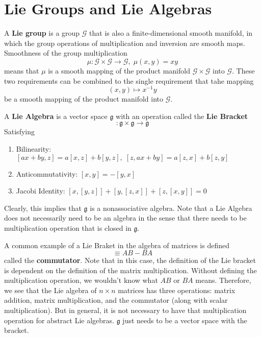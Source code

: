 \section{Lie Groups and Lie Algebras}

  \begin{definition}
    A \textbf{Lie group} is a group $\mathcal{G}$ that is also a finite-dimensional smooth manifold, in which the group operations of multiplication and inversion are smooth maps. Smoothness of the group multiplication
    \begin{equation}
      \mu: \mathcal{G} \times \mathcal{G} \rightarrow \mathcal{G}, \; \mu(x, y) = x y
    \end{equation}
    means that $\mu$ is a smooth mapping of the product manifold $\mathcal{G} \times \mathcal{G}$ into $\mathcal{G}$. These two requirements can be combined to the single requirement that tahe mapping 
    \begin{equation}
      (x, y) \mapsto x^{-1} y
    \end{equation}
    be a smooth mapping of the product manifold into $\mathcal{G}$. 
  \end{definition}

  \begin{definition}
    A \textbf{Lie Algebra} is a vector space $\mathfrak{g}$ with an operation called the \textbf{Lie Bracket} 
    \begin{equation}
      [\cdot, \cdot]: \mathfrak{g} \times \mathfrak{g} \rightarrow \mathfrak{g}
    \end{equation}
    Satisfying
    \begin{enumerate}
      \item Bilinearity: $[ax + by, z] = a[x,z] + b[y,z], \; [z, ax + by] = a[z, x] + b[z,y]$
      \item Anticommutativity: $[x,y] = -[y,x]$
      \item Jacobi Identity: $[x,[y,z]] + [y,[z,x]] + [z,[x,y]] = 0$
    \end{enumerate}
    Clearly, this implies that $\mathfrak{g}$ is a nonassociative algebra. Note that a Lie Algebra does not necessarily need to be an algebra in the sense that there needs to be multiplication operation that is closed in $\mathfrak{g}$. 
  \end{definition}

  \begin{example}
    A common example of a Lie Braket in the algebra of matrices is defined
    \begin{equation}
      [A, B] \equiv AB - BA
    \end{equation}
    called the \textbf{commutator}. Note that in this case, the definition of the Lie bracket is dependent on the definition of the matrix multiplication. Without defining the multiplication operation, we wouldn't know what $AB$ or $BA$ means. Therefore, we see that the Lie algebra of $n \times n$ matrices has three operations: matrix addition, matrix multiplication, and the commutator (along with scalar multiplication). But in general, it is not necessary to have that multiplication operation for abstract Lie algebras. $\mathfrak{g}$ just needs to be a vector space with the bracket.  
  \end{example}

